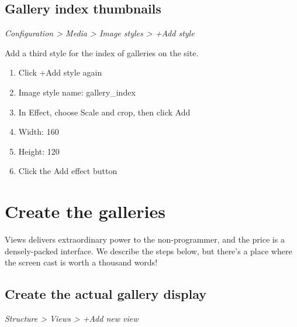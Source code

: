 \documentclass[letterpaper,10pt,english]{sphinxmanual}
\begin{document}
\section{Gallery index thumbnails}
\label{slideshows:gallery-index-thumbnails}
\emph{Configuration \textgreater{} Media \textgreater{} Image styles \textgreater{} +Add style}

Add a third style for the index of galleries on the site.
\begin{enumerate}
\item {} 
Click +Add style again

\item {} 
Image style name: gallery\_index

\item {} 
In Effect, choose Scale and crop, then click Add

\item {} 
Width: 160

\item {} 
Height: 120

\item {} 
Click the Add effect button

\end{enumerate}


\chapter{Create the galleries}
\label{slideshows:create-the-galleries}
Views delivers extraordinary power to the non-programmer, and the price is a densely-packed interface. We describe the steps below, but there's a place where the screen cast is worth a thousand words!


\section{Create the actual gallery display}
\label{slideshows:create-the-actual-gallery-display}
\emph{Structure \textgreater{} Views \textgreater{} +Add new view}
\end{document}

